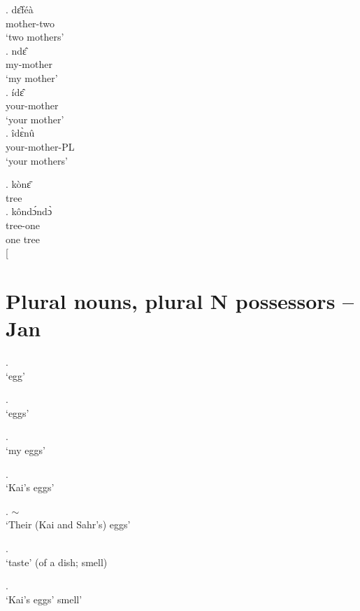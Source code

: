 \documentclass{assets/fieldnotes}
\begin{document}
 \ex. dɛ̂féà\\
  mother-two\\
`two mothers'\\

 \ex. ndɛ̂\\
  my-mother\\
`my mother'\\

 \ex. ídɛ̂\\
  your-mother\\
`your mother'\\

 \ex. îdɛ̀nû\\
  your-mother-PL\\
`your mothers'\\



\exg. kònɛ̄\\
tree\\

\exg. kôndɔ́ndɔ̀\\
  tree-one\\
one tree\\



[\section{Plural nouns, plural N possessors -- Jan} 

\ex.  \\
`egg' 

\ex.  \\
`eggs' 

\ex.  \\
`my eggs' 

\ex.  \\
`Kai's eggs' 

\ex.  $\sim$ \\
`Their (Kai and Sahr's) eggs' 


\ex.  \\
`taste' (of a dish; smell) 

\ex.  \\
`Kai's eggs' smell'
\end{document}
